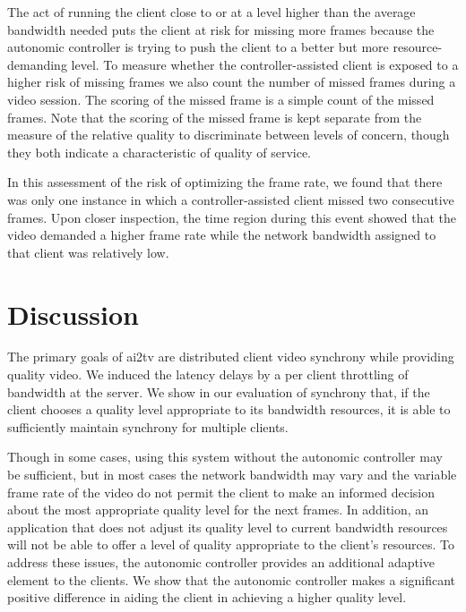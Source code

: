 \documentclass{sig-alternate}
\begin{document}
The act of running the client close to or at a level higher than the
average bandwidth needed puts the client at risk for missing more
frames because the autonomic controller is trying to push the client
to a better but more resource-demanding level.  To measure whether the
controller-assisted client is exposed to a higher risk of missing
frames we also count the number of missed frames during a video
session.  The scoring of the missed frame is a simple count of the
missed frames.  Note that the scoring of the missed frame is kept
separate from the measure of the relative quality to discriminate
between levels of concern, though they both indicate a characteristic
of quality of service.

In this assessment of the risk of optimizing the frame rate, we found
that there was only one instance in which a controller-assisted client
missed two consecutive frames.  Upon closer inspection, the time
region during this event showed that the video demanded a higher frame
rate while the network bandwidth assigned to that client was
relatively low.


\section{Discussion} \label{discussion}
The primary goals of ai2tv are distributed client video synchrony
while providing quality video.  We induced the latency delays by a per
client throttling of bandwidth at the server.  We show in our
evaluation of synchrony that, if the client chooses a quality level
appropriate to its bandwidth resources, it is able to sufficiently
maintain synchrony for multiple clients.

Though in some cases, using this system without the autonomic
controller may be sufficient, but in most cases the network bandwidth
may vary and the variable frame rate of the video do not permit the
client to make an informed decision about the most appropriate quality
level for the next frames.  In addition, an application that does not
adjust its quality level to current bandwidth resources will not be
able to offer a level of quality appropriate to the client's
resources.  To address these issues, the autonomic controller provides
an additional adaptive element to the clients.  We show that the
autonomic controller makes a significant positive difference in aiding
the client in achieving a higher quality level.
\end{document}
